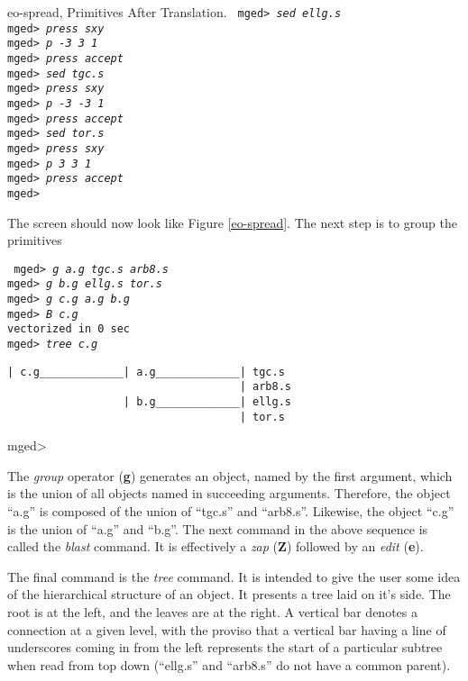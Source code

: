 \mfig eo-spread, Primitives After Translation.
\noindent
{\tt
mged> {\em sed ellg.s}\\
mged> {\em press sxy}\\
mged> {\em p -3 3 1}\\
mged> {\em press accept}\\
mged> {\em sed tgc.s}\\
mged> {\em press sxy}\\
mged> {\em p -3 -3 1}\\
mged> {\em press accept}\\
mged> {\em sed tor.s}\\
mged> {\em press sxy}\\
mged> {\em p 3 3 1}\\
mged> {\em press accept}\\
mged>\\
}

The screen should now look like Figure \ref{eo-spread}.  The next step
is to group the primitives

\noindent
{\tt
mged> {\em g a.g tgc.s arb8.s}\\
mged> {\em g b.g ellg.s tor.s}\\
mged> {\em g c.g a.g b.g}\\
mged> {\em B c.g}\\
vectorized in 0 sec\\
mged> {\em tree c.g}
\begin{verbatim}
| c.g_____________| a.g_____________| tgc.s
                                    | arb8.s
                  | b.g_____________| ellg.s
                                    | tor.s
\end{verbatim}
\noindent
mged>\\
}

The {\em group} operator ({\bf g}) generates an object, named by the
first argument, which is the union of all objects named in succeeding
arguments.  Therefore, the object ``a.g'' is composed of the union of
``tgc.s'' and ``arb8.s''.  Likewise, the object ``c.g'' is the union of
``a.g'' and ``b.g''.  The next command in the above sequence is called
the {\em blast} command.  It is effectively a {\em zap} ({\bf Z})
followed by an {\em edit} ({\bf e}).

The final command is the {\em tree} command.  It is intended to give the
user some idea of the hierarchical structure of an object.  It presents
a tree laid on it's side.  The root is at the left, and the leaves are
at the right. A vertical bar denotes a connection at a given level, with
the proviso that a vertical bar having a line of underscores coming
in from the left represents the start of a particular subtree when read
from top down (``ellg.s'' and ``arb8.s'' do not have a common parent).

